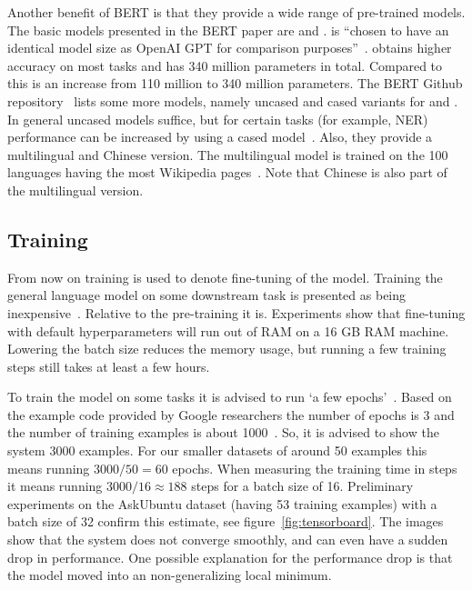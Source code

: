 Another benefit of BERT is that they provide a wide range of pre-trained models.
The basic models presented in the BERT paper are  and .
 is ``chosen to have an identical model size as OpenAI GPT for comparison purposes''~\citep{devlin2018}.
 obtains higher accuracy on most tasks and has 340 million parameters in total.
Compared to  this is an increase from 110 million to 340 million parameters.
The BERT Github repository~\citep{devlin2018github} lists some more models, namely uncased and cased variants for  and .
In general uncased models suffice, but for certain tasks (for example, NER) performance can be increased by using a cased model~\citep{devlin2018github}.
Also, they provide a multilingual and Chinese version.
The multilingual model is trained on the 100 languages having the most Wikipedia pages~\citep{devlin2019multi}.
Note that Chinese is also part of the multilingual version.

\subsection{Training}
\label{subsec:training}
From now on training is used to denote fine-tuning of the model.
Training the general language model on some downstream task is presented as being inexpensive~\citep{devlin2018github}.
Relative to the pre-training it is.
Experiments show that fine-tuning with default hyperparameters will run out of RAM on a 16 GB RAM machine.
Lowering the batch size reduces the memory usage, but running a few training steps still takes at least a few hours.

To train the model on some tasks it is advised to run `a few epochs'~\citep{devlin2018github}.
Based on the example code provided by Google researchers the number of epochs is 3 and the number of training examples is about 1000~\citep{bajaj2018}.
So, it is advised to show the system $3000$ examples.
For our smaller datasets of around 50 examples this means running $3000 / 50 = 60$ epochs.
When measuring the training time in steps it means running $3000 / 16 \approx 188$ steps for a batch size of 16.
Preliminary experiments on the AskUbuntu dataset (having 53 training examples) with a batch size of 32 confirm this estimate, see figure~\ref{fig:tensorboard}.
The images show that the system does not converge smoothly, and can even have a sudden drop in performance.
One possible explanation for the performance drop is that the model moved into an non-generalizing local minimum.

